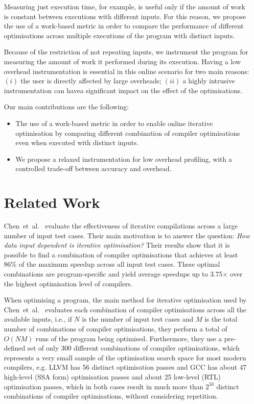 \documentclass[sigplan,9pt]{acmart}
\newcommand{\etal}{et~al.}
\begin{document}
Measuring just execution time, for example, is useful only if the
amount of work is constant between executions with different inputs.
For this reason, we propose the use of a work-based metric in order
to compare the performance of different optimisations across 
multiple executions of the program with distinct inputs.

Because of the restriction of not repeating inputs, we instrument the program
for measuring the amount of work it performed during its execution.
Having a low overhead instrumentation is essential in this online scenario for
two main reasons:
$(i)$ the user is directly affected by large overheads;
$(ii)$ a highly intrusive instrumentation can havea significant impact on the
effect of the optimisations.

Our main contributions are the following:
\begin{itemize}
\item The use of a work-based metric in order to enable online iterative
optimisation by comparing different combination of compiler optimisations even
when executed with distinct inputs.
\item We propose a relaxed instrumentation for low overhead profiling, with a controlled
trade-off between accuracy and overhead.
\end{itemize}

\section{Related Work}

Chen~\etal~\cite{chen10,chen12a} evaluate the effectiveness of iterative
compilations across a large number of input test cases.
Their main motivation is to answer the question:
\textit{How data input dependent is iterative optimisation?}
Their results show that it is possible to find a combination of compiler optimisations
that achieves at least 86\% of the maximum speedup across all input test cases.
These optimal combinations are program-specific and yield average
speedups up to 3.75$\times$ over the highest optimisation level of compilers.

When optimising a program, the main method for iterative optimisation used by Chen~\etal~\cite{chen10,chen12a}
evaluates each combination of compiler optimisations across all the available inputs, i.e.,
if $N$ is the number of input test cases and $M$ is the total number of combinations of compiler optimisations,
they perform a total of $O(NM)$ runs of the program being optimised.
Furthermore, they use a pre-defined set of only 300 different combinations of compiler optimisations,
which represents a very small sample of the optimisation search space for most modern compilers, e.g.
LLVM has 56 distinct optimisation passes and GCC has about 47 high-level (SSA form) optimisation passes and
about 25 low-level (RTL) optimisation passes, which in both cases result in much more than $2^{50}$ distinct
combinations of compiler optimisations, without considering repetition.
\end{document}
